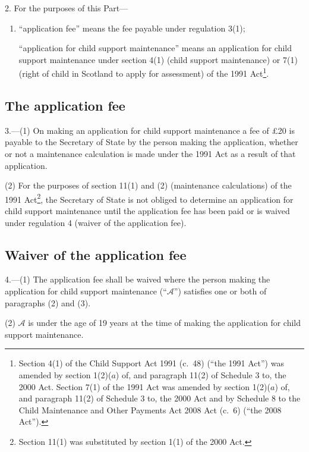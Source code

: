 \documentclass[12pt,a4paper]{article}
\begin{document}
2.  For the purposes of this Part—
\begin{enumerate}\item[]
“application fee” means the fee payable under regulation 3(1);

“application for child support maintenance” means an application for child support maintenance under section 4(1) (child support maintenance) or 7(1) (right of child in Scotland to apply for assessment) of the 1991 Act\footnote{Section 4(1) of the Child Support Act 1991 (c.~48) (“the 1991 Act”) was amended by section 1(2)($a$)  of, and paragraph 11(2) of Schedule 3 to, the 2000 Act. Section 7(1) of the 1991 Act was amended by section 1(2)($a$)  of, and paragraph 11(2) of Schedule 3 to, the 2000 Act and by Schedule 8 to the Child Maintenance and Other Payments Act 2008 Act (c.~6) (“the 2008 Act”).}.
\end{enumerate}

\subsection[3. The application fee]{The application fee}

3.—(1) On making an application for child support maintenance a fee of £20 is payable to the Secretary of State by the person making the application, whether or not a maintenance calculation is made under the 1991 Act as a result of that application.

(2) For the purposes of section 11(1) and (2) (maintenance calculations) of the 1991 Act\footnote{Section 11(1) was substituted by section 1(1) of the 2000 Act.}, the Secretary of State is not obliged to determine an application for child support maintenance until the application fee has been paid or is waived under regulation 4 (waiver of the application fee).

\subsection[4. Waiver of the application fee]{Waiver of the application fee}

4.—(1) The application fee shall be waived where the person making the application for child support maintenance (“$\mathcal{A}$”) satisfies one or both of paragraphs (2) and (3).

(2) $\mathcal{A}$ is under the age of 19 years at the time of making the application for child support maintenance.
\end{document}
